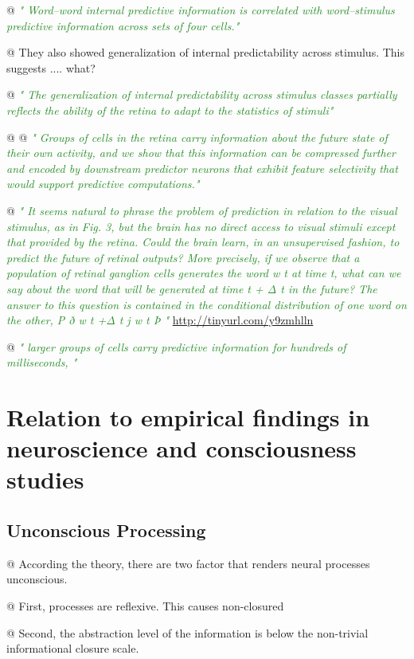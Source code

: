 \documentclass[utf8]{article}
\newenvironment{ants}
			{
			 \begin{easylist}[itemize]
			}
			{
			\end{easylist}
			}
\newcommand{\rewrite}[1]{\textcolor{ForestGreen}{\textit{"#1"}}\newline}
\begin{document}
\begin{ants}
			@ \rewrite{
				Word–word internal predictive information is correlated with word–stimulus predictive information across sets of four cells.}
			
			@ They also showed generalization of internal predictability across stimulus. This suggests .... what?
			
			@ \rewrite{
				The generalization of internal predictability across stimulus classes partially reflects the ability of the retina to adapt to the statistics of stimuli}
			
			
			@ \cite{Palmer2015}
			@ \rewrite{
				Groups of cells in the retina carry information about the future state of their own activity, and we show that this information can be compressed further and encoded by downstream predictor neurons that exhibit feature selectivity that would support predictive computations.}
			
			@ \rewrite{
				It seems natural to phrase the problem of prediction in relation to the visual stimulus, as in Fig. 3, but the brain has no direct access to visual stimuli except that provided by the retina. Could the brain learn, in an unsupervised fashion, to predict the future of retinal outputs? More precisely, if we observe that a population of retinal ganglion cells generates the word w t at time t, what can we say about the word that will be generated at time t + Δ t in the future? The answer to this question is contained in the conditional distribution of one word on the other, P ð w t +Δ t j w t Þ } \url{http://tinyurl.com/y9zmhlln}	
			
			@ \rewrite{
				larger groups of cells carry predictive information for hundreds of milliseconds, }
		
		\end{ants}




	\section{Relation to empirical findings in neuroscience and consciousness studies}
	
		\subsection{Unconscious Processing}
			\begin{ants}
				@ According the theory, there are two factor that renders neural processes unconscious. 
				
				@ First, processes are reflexive. This causes non-closured
				
				@ Second, the abstraction level of the information is below the non-trivial informational closure scale. 
			\end{ants}
		
\end{document}
